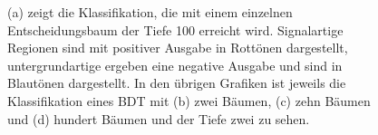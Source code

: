 \begin{figure}[tbp]
\centering     %
{}
\caption{(a) zeigt die Klassifikation, die mit einem einzelnen Entscheidungsbaum der Tiefe 100 erreicht wird. Signalartige Regionen sind mit positiver Ausgabe in Rott\"onen dargestellt, untergrundartige ergeben eine negative Ausgabe und sind in Blaut\"onen dargestellt. In den \"ubrigen Grafiken ist jeweils die Klassifikation eines BDT mit (b) zwei B\"aumen, (c) zehn B\"aumen und (d) hundert B\"aumen und der Tiefe zwei zu sehen.}
\label{fig:boosting}
\end{figure}

